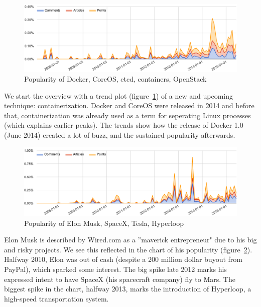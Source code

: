 \begin{figure}[H] %
	\caption{Popularity of Docker, CoreOS, etcd, containers, OpenStack}
	\label{fig:trend_docker}
	\centering
	\includegraphics[width=14cm]{topic_trends/docker_relative}
\end{figure}
We start the overview with a trend plot (figure~\ref{fig:trend_docker}) of a new and upcoming technique: containerization. Docker and CoreOS were released in 2014 and before that, containerization was already used as a term for seperating Linux processes (which explains earlier peaks). The trends show how the release of Docker 1.0 (June 2014) created a lot of buzz, and the sustained popularity afterwards.

\begin{figure}[H] %
	\caption{Popularity of Elon Musk, SpaceX, Tesla, Hyperloop}
	\label{fig:trend_elon}
	\centering
	\includegraphics[width=14cm]{topic_trends/elon_relative}
\end{figure}
Elon Musk is described by Wired.com as a ''maverick entrepreneur" due to his big and risky projects. We see this reflected in the chart of his popularity (figure~\ref{fig:trend_elon}). Halfway 2010, Elon was out of cash (despite a 200 million dollar buyout from PayPal), which sparked some interest. The big spike late 2012 marks his expressed intent to have SpaceX (his spacecraft company) fly to Mars. The biggest spike in the chart, halfway 2013, marks the introduction of Hyperloop, a high-speed transportation system.

